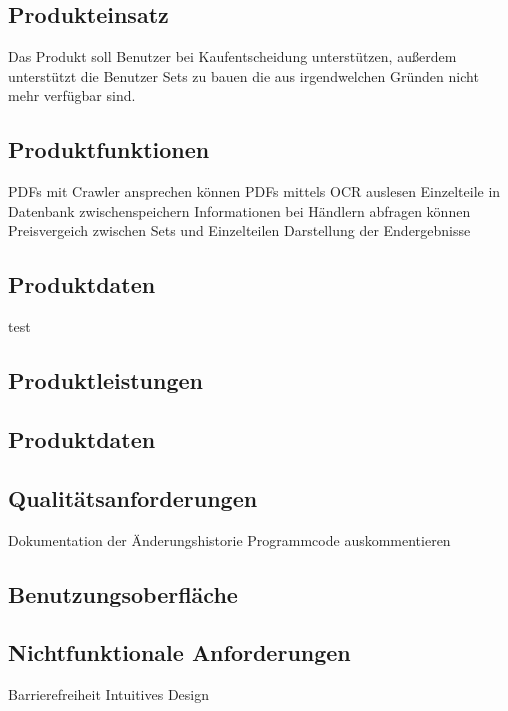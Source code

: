 \subsection{Produkteinsatz}
 Das Produkt soll Benutzer bei Kaufentscheidung unterstützen, außerdem unterstützt die Benutzer Sets zu bauen die aus irgendwelchen Gründen nicht mehr verfügbar sind.\newline

\subsection{Produktfunktionen}
PDFs mit Crawler ansprechen können \newline
PDFs mittels OCR auslesen \newline
Einzelteile in Datenbank zwischenspeichern \newline
Informationen bei Händlern abfragen können \newline
Preisvergeich zwischen Sets und Einzelteilen \newline
Darstellung der Endergebnisse \newline

\subsection{Produktdaten}
test
\subsection{Produktleistungen}

\subsection{Produktdaten}

\subsection{Qualitätsanforderungen}
Dokumentation der Änderungshistorie \newline
Programmcode auskommentieren \newline

\subsection{Benutzungsoberfläche}

\subsection{Nichtfunktionale Anforderungen}
Barrierefreiheit \newline
Intuitives Design \newline

